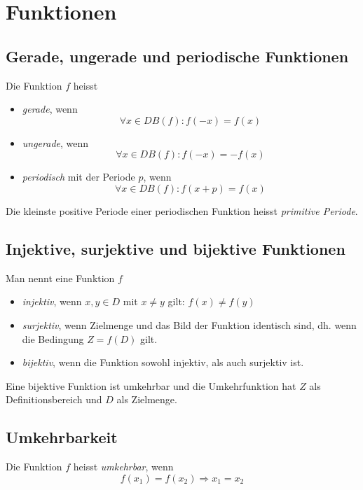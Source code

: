 \section{Funktionen}

\subsection{Gerade, ungerade und periodische Funktionen}

Die Funktion $f$ heisst

\begin{itemize}
	\item \textit{gerade}, wenn \[\forall x \in DB(f): f(-x) = f(x)\]
	\item \textit{ungerade}, wenn \[\forall x \in DB(f): f(-x) = -f(x)\]
	\item \textit{periodisch} mit der Periode $p$, wenn \[\forall x \in DB(f): f(x + p) = f(x)\]
\end{itemize}

Die kleinste positive Periode einer periodischen Funktion heisst \textit{primitive Periode}.

\subsection{Injektive, surjektive und bijektive Funktionen}

Man nennt eine Funktion $f$

\begin{itemize}
\item \textit{injektiv}, wenn $x,y \in D$ mit $x\neq y$ gilt: $f(x) \neq f(y)$
\item \textit{surjektiv}, wenn  Zielmenge und das Bild der Funktion identisch sind, dh. wenn die Bedingung $Z = f(D)$ gilt.
\item \textit{bijektiv}, wenn die Funktion sowohl injektiv, als auch surjektiv ist. 
\end{itemize}

Eine bijektive Funktion ist umkehrbar und die Umkehrfunktion hat $Z$ als Definitionsbereich und $D$ als Zielmenge.

\subsection{Umkehrbarkeit}

Die Funktion $f$ heisst \textit{umkehrbar}, wenn
%
\begin{displaymath}
	f(x_1) = f(x_2) \Rightarrow x_1 = x_2
\end{displaymath}

